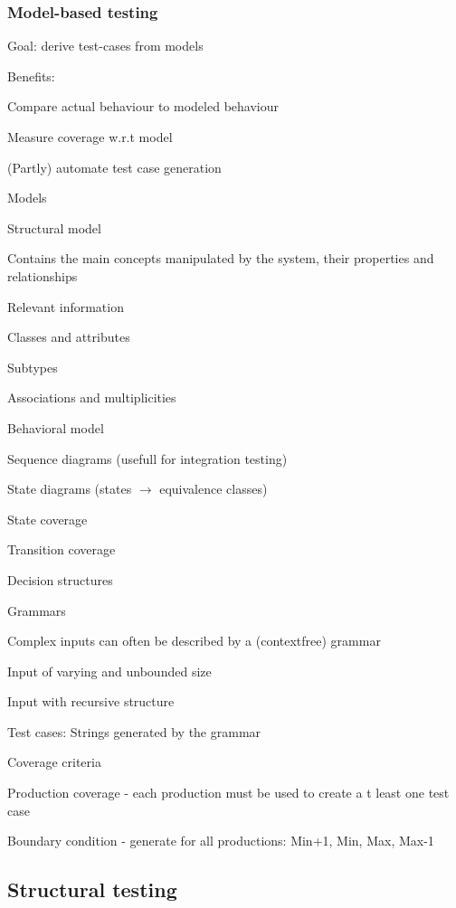 \subsubsection{Model-based testing}
\enumstart
	\item Goal: derive test-cases from models
	\item Benefits:
	\enumstart
		\item Compare actual behaviour to modeled behaviour
		\item Measure coverage w.r.t model
		\item (Partly) automate test case generation
	\enumend
	\item Models
	\enumstart
		\item Structural model
		\enumstart
			\item Contains the main concepts manipulated by the system, their properties and relationships
			\item Relevant information
			\enumstart
				\item Classes and attributes
				\item Subtypes
				\item Associations and multiplicities
			\enumend
		\enumend
		\item Behavioral model
		\enumstart
			\item Sequence diagrams (usefull for integration testing)
			\item State diagrams (states $\rightarrow$ equivalence classes)
			\enumstart
				\item State coverage
				\item Transition coverage
			\enumend
		\enumend
		\item Decision structures
		\item Grammars
		\enumstart
			\item Complex inputs can often be described by a (contextfree) grammar
			\item Input of varying and unbounded size
			\item Input with recursive structure
			\item Test cases: Strings generated by the grammar
			\item Coverage criteria
			\enumstart
				\item Production coverage - each production must be used to create a t least one test case
				\item Boundary condition - generate for all productions: Min+1, Min, Max, Max-1
			\enumend
		\enumend
	\enumend
\enumend

\subsection{Structural testing}